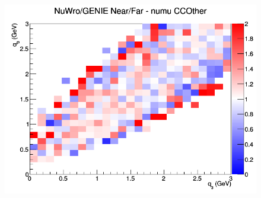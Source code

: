 \begin{figure}[h]
\endminipage
{}
\includegraphics[width=\linewidth]{eff_q0_q3/GAr/ratios/CCOther_NuWro_GENIE_numu_NF_q3_q0.png}
\endminipage
\newline
\end{figure}
\clearpage

